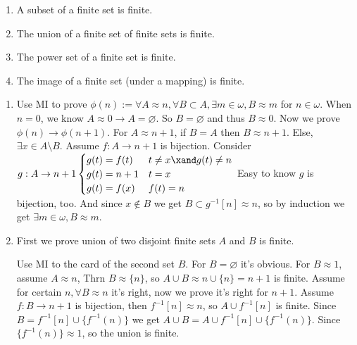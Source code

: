 \documentclass{ctexart}
\begin{document}
\begin{problem}
\begin{enumerate}[ref=\theproblem.\arabic*]
	\item\label{it:2.1} A subset of a finite set is finite.
	\item\label{it:2.2} The union of a finite set of finite sets is finite.
	\item The power set of a finite set is finite.
	\item The image of a finite set (under a mapping) is finite.
\end{enumerate}
\end{problem}

\begin{solution}
	\begin{enumerate}
		\item Use MI to prove $\phi(n):=\forall A\approx n,\forall B\subset A,\exists m\in \omega,B\approx m$ for $n\in \omega$. When $n=0$, we know $A\approx 0\to A=\varnothing$. So $B=\varnothing$ and thus $B\approx 0$. Now we prove $\phi(n)\to \phi(n+1)$. For $A\approx n+1$, if $B=A$ then $B\approx n+1$. Else, $\exists x\in A\setminus B$. Assume $f:A\to n+1$ is bijection. Consider $g:A\to n+1
			      \begin{cases}
				      g(t)=f(t) & t\neq x\xand g(t)\neq n \\
				      g(t)=n+1  & t=x                     \\
				      g(t)=f(x) & f(t)=n
			      \end{cases}$
		      Easy to know $g$ is bijection, too. And since $x\notin B$ we get $B\subset g^{-1}[n]\approx n$, so by induction we get $\exists m\in \omega,B\approx m$.
		\item First we prove union of two disjoint finite sets $A$ and $B$ is finite.

		      Use MI to the card of the second set $B$. For $B=\varnothing$ it's obvious. For $B\approx 1$, assume $A\approx n$, Thrn $B\approx \{n\}$, so $A\cup B\approx n\cup\{n\}=n+1$ is finite. Assume for certain $n,\forall B\approx n$ it's right, now we prove it's right for $n+1$. Assume $f:B\to n+1$ is bijection, then $f^{-1}[n]\approx n$, so $A\cup f^{-1}[n]$ is finite. Since $B=f^{-1}[n]\cup\{f^{-1}(n)\}$ we get $A\cup B=A\cup f^{-1}[n]\cup\{f^{-1}(n)\}$. Since $\{f^{-1}(n)\}\approx 1$, so the union is finite.


\end{enumerate}
\end{solution}
\end{document}
